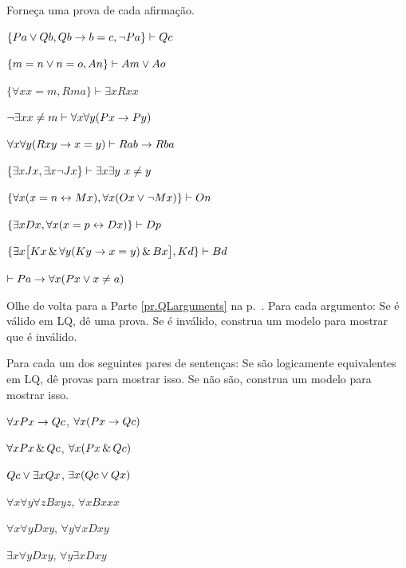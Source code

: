 \problempart
\label{pr.identity}
Forneça uma prova de cada afirmação.
\begin{earg}
\item $\{Pa \vee Qb, Qb \rightarrow b=c, \neg Pa\}\vdash Qc$
\item $\{m=n \vee n=o, An\}\vdash Am \vee Ao$
\item $\{\forall x x=m, Rma\}\vdash \exists x Rxx$
\item $\neg \exists x x \neq m \vdash \forall x\forall y (Px \rightarrow Py)$
\item $\forall x\forall y(Rxy \rightarrow x=y)\vdash Rab \rightarrow Rba$
\item $\{\exists x Jx, \exists x \neg Jx\}\vdash \exists x \exists y\ x\neq y$
\item $\{\forall x(x=n \leftrightarrow Mx), \forall x(Ox \vee \neg Mx)\}\vdash On$
\item $\{\exists x Dx, \forall x(x=p \leftrightarrow Dx)\}\vdash Dp$
\item $\{\exists x\bigl[Kx \,\&\, \forall y(Ky \rightarrow x=y) \,\&\, Bx\bigr], Kd\}\vdash Bd$
\item $\vdash Pa \rightarrow \forall x(Px \vee x \neq a)$
\end{earg}



\problempart
Olhe de volta para a Parte \ref{pr.QLarguments} na p.~\pageref{pr.QLarguments}. Para cada argumento: Se é válido em LQ, dê uma prova. Se é inválido, construa um modelo para mostrar que é inválido.

\solutions
\problempart
\label{pr.QLequivornot}
Para cada um dos seguintes pares de sentenças: Se são logicamente equivalentes em LQ, dê provas para mostrar isso. Se não são, construa um modelo para mostrar isso.
\begin{earg}
\item $\forall x Px \rightarrow Qc$, $\forall x (Px \rightarrow Qc)$
\item $\forall x Px \,\&\, Qc$, $\forall x (Px \,\&\, Qc)$
\item $Qc \vee \exists x Qx$, $\exists x (Qc \vee Qx)$
\item $\forall x\forall y \forall z Bxyz$, $\forall x Bxxx$
\item $\forall x\forall y Dxy$, $\forall y\forall x Dxy$
\item $\exists x\forall y Dxy$, $\forall y\exists x Dxy$
\end{earg}

